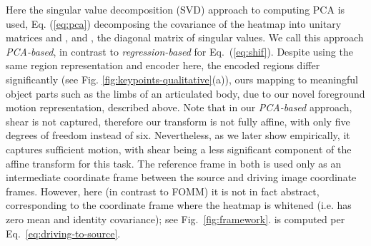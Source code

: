 \documentclass[final]{cvpr}
\begin{document}
\noindent Here the singular value decomposition (SVD) approach to computing PCA \cite{wall2003singular} is used, Eq. (\ref{eq:pca}) decomposing the covariance of the heatmap into unitary matrices  and , and , the diagonal matrix of singular values.
We call this approach \emph{PCA-based}, in contrast to \emph{regression-based} for Eq.~(\ref{eq:shif}). Despite using the same region representation and encoder here, the encoded regions differ significantly (see Fig. \ref{fig:keypoints-qualitative}(a)), ours mapping to meaningful object parts such as the limbs of an articulated body, due to our novel foreground motion representation, described above. Note that in our \emph{PCA-based} approach, shear is not captured, therefore our transform is not fully affine, with only five degrees of freedom instead of six. Nevertheless, as we later show empirically, it captures sufficient motion, with shear being a less significant component of the affine transform for this task. The reference frame in both is used only as an intermediate coordinate frame between the source and driving image coordinate frames. However, here (in contrast to FOMM) it is not in fact abstract, corresponding to the coordinate frame where the heatmap is whitened (i.e. has zero mean and identity covariance); see Fig.~\ref{fig:framework}.  is computed per Eq.~\eqref{eq:driving-to-source}.
\end{document}

